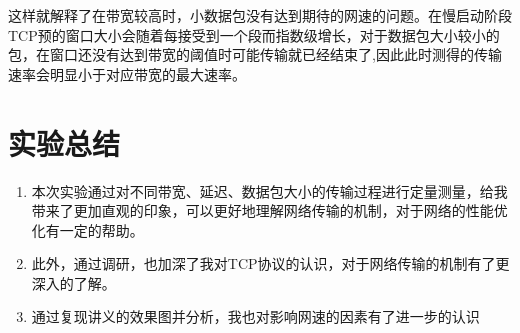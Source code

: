 \documentclass[11pt]{article}
\begin{document}
这样就解释了在带宽较高时，小数据包没有达到期待的网速的问题。在慢启动阶段TCP预的窗口大小会随着每接受到一个段而指数级增长，对于数据包大小较小的包，在窗口还没有达到带宽的阈值时可能传输就已经结束了,因此此时测得的传输速率会明显小于对应带宽的最大速率。

\section{实验总结}

\begin{enumerate}
  \item 本次实验通过对不同带宽、延迟、数据包大小的传输过程进行定量测量，给我带来了更加直观的印象，可以更好地理解网络传输的机制，对于网络的性能优化有一定的帮助。
  \item 此外，通过调研，也加深了我对TCP协议的认识，对于网络传输的机制有了更深入的了解。
  \item 通过复现讲义的效果图并分析，我也对影响网速的因素有了进一步的认识
\end{enumerate}
\end{document}

